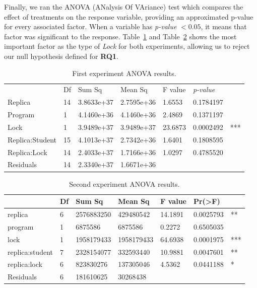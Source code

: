 Finally, we ran the ANOVA (ANalysis Of VAriance) test which compares the effect of treatments on the response variable, providing an approximated p-value for every associated factor. When a variable has \emph{p-value} $< 0.05$, it means that factor was significant to the response. Table~\ref{tab:unova1} and Table~\ref{tab:unova2} shows the most important factor as the type of \emph{Lock} for both experiments, allowing us to reject our null hypothesis defined for {\bf RQ1}.

\begin{table}%
\begin{center}
\caption{First experiment ANOVA results.}\label{tab:unova1}
\begin{tabular}{|l|l|l|l|l|ll|}
\hline
                & Df &    Sum Sq  &  Mean Sq   & F value & \emph{p-value} &     \\  
Replica         & 14 & 3.8633e+37 & 2.7595e+36 & 1.6553  & 0.1784197 &     \\   
Program         & 1  & 4.1460e+36 & 4.1460e+36 & 2.4869  & 0.1371197 &     \\   
Lock            & 1  & 3.9489e+37 & 3.9489e+37 & 23.6873 & 0.0002492 & *** \\
Replica:Student & 15 & 4.1013e+37 & 2.7342e+36 & 1.6401  & 0.1808595 &     \\  
Replica:Lock    & 14 & 2.4033e+37 & 1.7166e+36 & 1.0297  & 0.4785520 &     \\  
Residuals       & 14 & 2.3340e+37 & 1.6671e+36 &         &           &     \\
\hline
\end{tabular}
\end{center}
\end{table}

\begin{table}%
\begin{center}
\caption{Second experiment ANOVA results.}\label{tab:unova2}
\begin{tabular}{|l|l|l|l|l|ll|}
\hline
                 & Df &    Sum Sq &   Mean Sq  & F value &   Pr(>F) & \\   
\hline
replica          & 6 & 2576883250 &  429480542 & 14.1891 & 0.0025793 & **  \\
program          & 1 &    6875586 &    6875586 &  0.2272 & 0.6505035 &     \\
lock             & 1 & 1958179433 & 1958179433 & 64.6938 & 0.0001975 & *** \\
replica:student  & 7 & 2328154077 &  332593440 & 10.9881 & 0.0047601 & **  \\
replica:lock     & 6 &  823830276 &  137305046 &  4.5362 & 0.0441188 & *   \\
Residuals        & 6 &  181610625 &   30268438 &         &           &     \\
\hline
\end{tabular}
\end{center}
\end{table}

